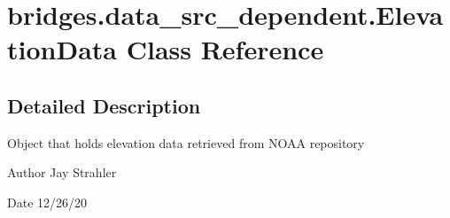 \hypertarget{classbridges_1_1data__src__dependent_1_1_elevation_data}{}\section{bridges.\+data\+\_\+src\+\_\+dependent.\+Elevation\+Data Class Reference}
\label{classbridges_1_1data__src__dependent_1_1_elevation_data}


\subsection{Detailed Description}
Object that holds elevation data retrieved from N\+O\+AA repository

\begin{DoxyAuthor}{Author}
Jay Strahler
\end{DoxyAuthor}
\begin{DoxyDate}{Date}
12/26/20 
\end{DoxyDate}

